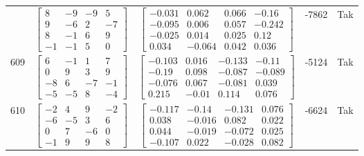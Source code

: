 \documentclass[a4paper,12pt]{article}
\begin{document}
\begin{tabular}{c c c c c}
&
$\begin{bmatrix} 8 & -9 & -9 & 5 \\ 9 & -6 & 2 & -7 \\ 8 & -1 & 6 & 9 \\ -1 & -1 & 5 & 0 \end{bmatrix}$
&
$\begin{bmatrix} -0.031 & 0.062 & 0.066 & -0.16 \\ -0.095 & 0.006 & 0.057 & -0.242 \\ -0.025 & 0.014 & 0.025 & 0.12 \\ 0.034 & -0.064 & 0.042 & 0.036 \end{bmatrix}$
&
-7862
&
Tak
\\
609
&
$\begin{bmatrix} 6 & -1 & 1 & 7 \\ 0 & 9 & 3 & 9 \\ -8 & 6 & -7 & -1 \\ -5 & -5 & 8 & -4 \end{bmatrix}$
&
$\begin{bmatrix} -0.103 & 0.016 & -0.133 & -0.11 \\ -0.19 & 0.098 & -0.087 & -0.089 \\ -0.076 & 0.067 & -0.081 & 0.039 \\ 0.215 & -0.01 & 0.114 & 0.076 \end{bmatrix}$
&
-5124
&
Tak
\\
610
&
$\begin{bmatrix} -2 & 4 & 9 & -2 \\ -6 & -5 & 3 & 6 \\ 0 & 7 & -6 & 0 \\ -1 & 9 & 9 & 8 \end{bmatrix}$
&
$\begin{bmatrix} -0.117 & -0.14 & -0.131 & 0.076 \\ 0.038 & -0.016 & 0.082 & 0.022 \\ 0.044 & -0.019 & -0.072 & 0.025 \\ -0.107 & 0.022 & -0.028 & 0.082 \end{bmatrix}$
&
-6624
&
Tak
\\
\end{tabular} \egroup \newpage
\end{document}
